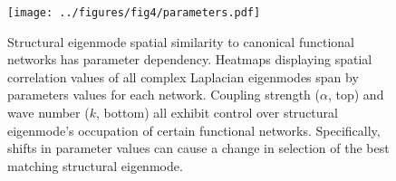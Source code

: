 \documentclass{article}
\begin{document}
\begin{figure}[ht]
\centering
\texttt{[image: ../figures/fig4/parameters.pdf]}
\caption{Structural eigenmode spatial similarity to canonical functional networks has parameter dependency. Heatmaps displaying spatial correlation values of all complex Laplacian eigenmodes span by parameters values for each network. Coupling strength ($\alpha$, top) and wave number ($k$, bottom) all exhibit control over structural eigenmode's occupation of certain functional networks. Specifically, shifts in parameter values can cause a change in selection of the best matching structural eigenmode.}
\label{fig:fig4}
\end{figure}


\end{document}
